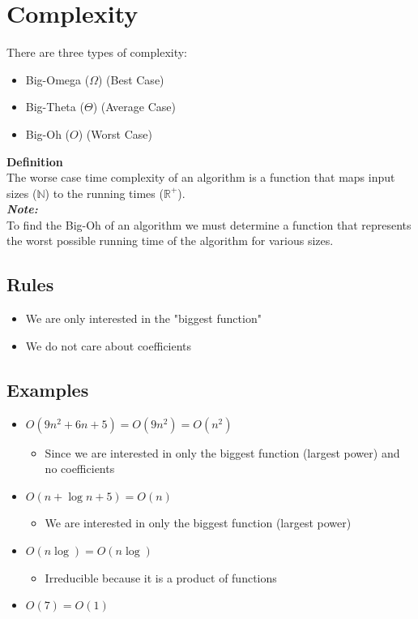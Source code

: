 \documentclass[hidelinks,11pt]{article}
\begin{document}
\section{Complexity}
There are three types of complexity:
\begin{itemize}
    \item Big-Omega ($\Omega$) (Best Case)
    \item Big-Theta ($\Theta$) (Average Case)
    \item Big-Oh ($O$) (Worst Case)
\end{itemize}
\textbf{Definition}\\
The worse case time complexity of an algorithm is a function that maps input sizes ($\mathbb N$) to the running times ($\mathbb R^+$).\\[0.5\baselineskip]
\textbf{\textit{Note:}}\\
To find the Big-Oh of an algorithm we must determine a function that represents the worst possible running time of the algorithm for various sizes.
\subsection{Rules}
\begin{itemize}
    \item We are only interested in the "biggest function"
    \item We do not care about coefficients
\end{itemize}
\subsection{Examples}
\begin{itemize}
    \item $O(9n^2+6n+5) = O(9n^2) = O(n^2)$ 
    \begin{itemize}
        \item Since we are interested in only the biggest function (largest power) and no coefficients
    \end{itemize} 
    \item $O(n+\log n +5) = O(n)$ 
    \begin{itemize}
        \item We are interested in only the biggest function (largest power)
    \end{itemize} 
    \item $O(n\log) = O(n\log)$ \begin{itemize}
        \item Irreducible because it is a product of functions
    \end{itemize} 
    \item $O(7) = O(1)$
\end{itemize}
\end{document}
